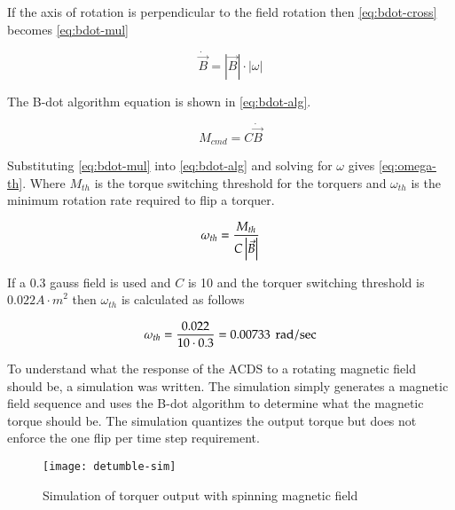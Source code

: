 If the axis of rotation is perpendicular to the field rotation then \cref{eq:bdot-cross} becomes \cref{eq:bdot-mul}

\begin{equation}
    \dot{\vec{B}} = \left| \vec{B} \right| \cdot \left| \omega \right|
    \label{eq:bdot-mul}
\end{equation}

The B-dot algorithm equation is shown in \cref{eq:bdot-alg}.

\begin{equation}
    M_{cmd} = C \dot{\vec{B}} 
    \label{eq:bdot-alg}
\end{equation}

Substituting \cref{eq:bdot-mul} into \cref{eq:bdot-alg} and solving for $\omega$ gives \cref{eq:omega-th}. Where $M_{th}$ is the torque switching threshold for the torquers and $\omega_{th}$ is the minimum rotation rate required to flip a torquer.

\begin{equation}
    \omega _ {th} = {M _ {th} \over{ {C \left| \vec{B} \right|}}}
    \label{eq:omega-th}
\end{equation}

If a 0.3 gauss field is used and $C$ is 10 and the torquer switching threshold is $0.022 \unit{A \cdot m} ^2$ then $\omega_{th}$ is calculated as follows

\begin{equation}
    \omega _ {th} = { 0.022 \over{ {10 \cdot 0.3}}} = 0.00733 ~ \, \mathrm{rad / sec}
\end{equation}

To understand what the response of the \ac{ACDS} to a rotating magnetic field should be, a simulation was written. The simulation simply generates a magnetic field sequence and uses the B-dot algorithm to determine what the magnetic torque should be. The simulation quantizes the output torque but does not enforce the one flip per time step requirement.

\begin{sidewaysfigure}
    \centering
    \texttt{[image: detumble-sim]}
  \caption{Simulation of torquer output with spinning magnetic field}
    \label{fig:detumble-sim}
\end{sidewaysfigure}



